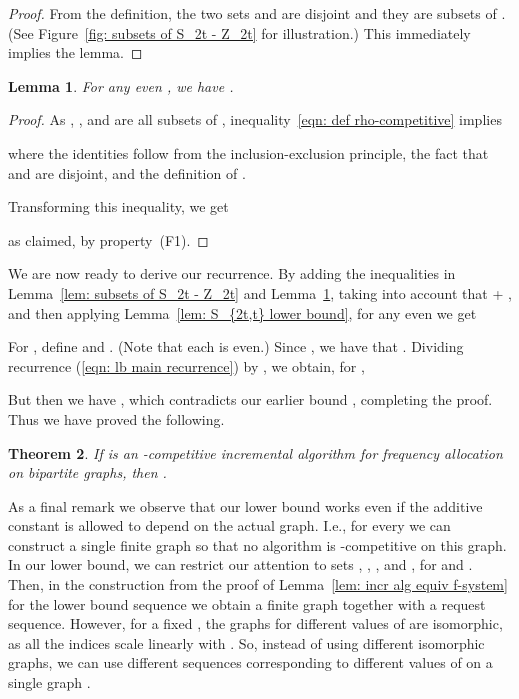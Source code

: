 \documentclass[11pt]{article}
\newtheorem{theorem}{Theorem}[section]
\newtheorem{lemma}[theorem]{Lemma}
\begin{document}
\begin{proof}
From the definition, the two sets
 and  are disjoint
and they are subsets of .
(See Figure~\ref{fig: subsets of S_2t - Z_2t} for illustration.)
This immediately implies the lemma. 
\end{proof}



\begin{lemma}\label{lem: 3Rt + ... >= 4t}
For any even , we have
.
\end{lemma}

\begin{proof}
As , ,  and  are all subsets of ,
inequality~\eqref{eqn: def rho-competitive} implies

where the identities follow from the inclusion-exclusion principle, the fact that
 and  are disjoint, and the definition
of .

Transforming this inequality, we get

as claimed, by property~(F1).
\end{proof}

We are now ready to derive our recurrence. By adding the inequalities in
Lemma~\ref{lem: subsets of S_2t - Z_2t} and Lemma~\ref{lem: 3Rt + ... >= 4t},
taking into account that  + ,
and then applying Lemma~\ref{lem: S_{2t,t} lower bound},
for any even  we get



For , define  and
. (Note that each
 is even.)
Since , we have
that .
Dividing recurrence (\ref{eqn: lb main recurrence}) by , 
we obtain, for ,

But then we have ,
which contradicts our earlier bound , completing
the proof. Thus we have proved the following.



\begin{theorem}\label{thm: 10/7 lower bound}
If  is an -competitive incremental algorithm for frequency
allocation on bipartite graphs, then .
\end{theorem}

As a final remark we observe that our lower bound works even if the
additive constant  is allowed to depend on the actual
graph. I.e., for every  we can construct a single finite graph
 so that no algorithm is -competitive on this graph.  In
 our lower bound, we can restrict our attention to sets
, , , and ,
for  and .  Then, in the construction from
the proof of Lemma~\ref{lem: incr alg equiv f-system} for
the lower bound sequence we obtain a finite graph together with a
request sequence. However, for a fixed , the
graphs for different values of  are isomorphic, as all the
indices scale linearly with . So, instead of using different
isomorphic graphs, we can use different sequences corresponding to
different values of  on a single graph .
\end{document}
